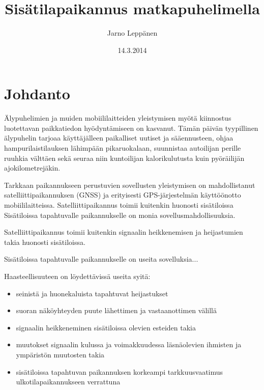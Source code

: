 \documentclass[a4paper]{scrartcl}
\author{Jarno Leppänen}
\title{Sisätilapaikannus matkapuhelimella}
\date{14.3.2014}
\begin{document}
\maketitle

\tableofcontents

\section{Johdanto}

Älypuhelimien ja muiden mobiililaitteiden yleistymisen myötä kiinnostus
luotettavan paikkatiedon hyödyntämiseen on kasvanut\cite{harle2013survey}.
Tämän päivän tyypillinen älypuhelin tarjoaa käyttäjälleen paikalliset uutiset
ja sääennusteen, ohjaa hampurilaistilauksen lähimpään pikaruokalaan, suunnistaa
autoilijan perille ruuhkia välttäen sekä seuraa niin kuntoilijan
kalorikulutusta kuin pyöräilijän ajokilometrejäkin.

Tarkkaan paikannukseen perustuvien sovellusten yleistymisen on mahdollistanut
satelliittipaikannuksen (GNSS) ja erityisesti GPS-järjestelmän käyttöönotto
mobiililaitteissa. Satelliittipaikannus toimii kuitenkin huonosti
sisätiloissa
Sisätiloissa tapahtuvalle paikannukselle on monia sovellusmahdollisuuksia. 


Satelliittipaikannus toimii kuitenkin signaalin
heikkenemisen ja heijastumien takia huonosti sisätiloissa.

Sisätiloissa tapahtuvalle paikannukselle on useita sovelluksia...

Haasteellisuuteen on löydettävissä useita
syitä\cite{mautz2012indoor}:
\begin{itemize}
  \item seinistä ja huonekaluista tapahtuvat heijastukset
  \item suoran näköyhteyden puute lähettimen ja vastaanottimen välillä
  \item signaalin heikkeneminen sisätiloissa olevien esteiden takia
  \item muutokset signaalin kulussa ja voimakkuudessa läsnäolevien ihmisten
    ja ympäristön muutosten takia
  \item sisätiloissa tapahtuvan paikannuksen korkeampi tarkkuusvaatimus
    ulkotilapaikannukseen verrattuna
\end{itemize}



\end{document}
